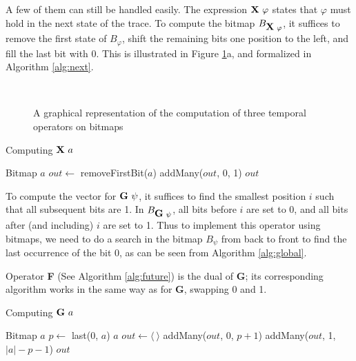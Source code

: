 A few of them can still be handled easily. The expression $\mathop{\mbox{\textbf{X}}}\,\varphi$ states that $\varphi$ must hold in the next state of the trace. To compute the bitmap $B_{\mathop{\mbox{\textbf{X}}}\,\varphi}$, it suffices to remove the first state of $B_\varphi$, shift the remaining bits one position to the left, and fill the last bit with 0. This is illustrated in Figure \ref{fig:patterns}a, and formalized in Algorithm \ref{alg:next}.

\begin{figure}
\centering
{}~~~
~~~
\caption{A graphical representation of the computation of three temporal operators on bitmaps}
\label{fig:patterns}
\end{figure}

\begin{algorithm}
\caption{Computing $\mathop{\mbox{\textbf{X}}}\, a$}
\label{alg:next}
\begin{algorithmic}[1]
\Require Bitmap $a$
\State $out \gets$ removeFirstBit($a$)
\State addMany($out$, 0, 1)
\State \Return $out$
\end{algorithmic}
\end{algorithm}

To compute the vector for $\mathop{\mbox{\textbf{G}}}\,\psi$, it suffices to find the smallest position $i$ such that all subsequent bits are 1. In $B_{\mathop{\mbox{\textbf{G}}}\,\psi}$, all bits before $i$ are set to 0, and all bits after (and including) $i$ are set to 1. Thus to implement this operator using bitmaps, we need to do a search in the bitmap $B_{\psi}$ from back to front to find the last occurrence of the bit 0, as can be seen from Algorithm \ref{alg:global}. %

Operator \textbf{F} (See Algorithm \ref{alg:future}) is the dual of \textbf{G}; its corresponding algorithm works in the same way as for \textbf{G}, swapping 0 and 1.

\begin{algorithm}
\caption{Computing $\mathop{\mbox{\textbf{G}}}\, a$}
\label{alg:global}
\begin{algorithmic}[1]
\Require Bitmap $a$
\State $p \gets$ last(0, $a$)
  \State \Return $a$
\Else
  \State $out \gets \langle~\rangle$
  \State addMany($out$, 0, $p + 1$)
  \State addMany($out$, 1, $|a| - p - 1$)
  \State \Return $out$
\EndIf
\end{algorithmic}
\end{algorithm}


